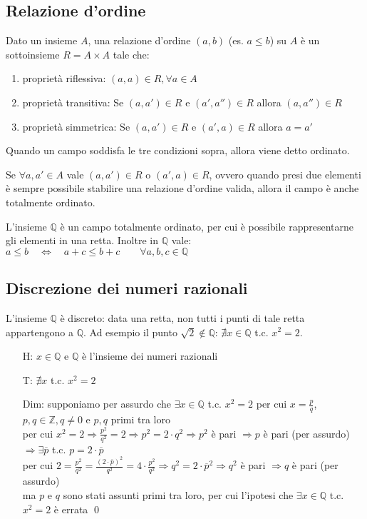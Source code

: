 \documentclass[a4paper]{article}
\begin{document}
\subsection{Relazione d'ordine}
Dato un insieme \(A\), una relazione d'ordine \((a, b)\) (es. \(a \leq b\)) su \(A\) è un sottoinsieme \(R = A \times A\) tale che:
\begin{enumerate}
	\item proprietà riflessiva: \((a, a) \in R, \forall a \in A\)
	\item proprietà transitiva: Se \((a, a') \in R\) e \((a', a'') \in R\) allora \((a, a'') \in R\)
	\item proprietà simmetrica: Se \((a, a') \in R\) e \((a', a) \in R\) allora \(a = a'\)
\end{enumerate}

Quando un campo soddisfa le tre condizioni sopra, allora viene detto ordinato.

Se \(\forall a,a' \in A\) vale \((a, a') \in R\) o \((a', a) \in R\), ovvero quando presi due elementi è sempre possibile
stabilire una relazione d'ordine valida, allora il campo è anche totalmente ordinato.

L'insieme \(\mathbb{Q}\) è un campo totalmente ordinato, per cui è possibile rappresentarne gli elementi in una retta.
Inoltre in \(\mathbb{Q}\) vale: \(a \leq b \quad \Leftrightarrow \quad a + c \leq b + c \qquad \forall a,b,c \in \mathbb{Q}\)


\subsection{Discrezione dei numeri razionali}
L'insieme \(\mathbb{Q}\) è discreto: data una retta, non tutti i punti di tale retta appartengono a \(\mathbb{Q}\).
Ad esempio il punto \(\sqrt{2} \notin \mathbb{Q}\): \(\nexists x \in \mathbb{Q}\) t.c. \(x^2 = 2\).
\begin{itemize}
	\item[H:] \(x \in \mathbb{Q}\) e \(\mathbb{Q}\) è l'insieme dei numeri razionali
	\item[T:] \(\nexists x\) t.c. \(x^2 = 2\)
	\item[Dim:] supponiamo per assurdo che \(\exists x \in \mathbb{Q}\) t.c. \(x^2 = 2\) per cui \(x = \displaystyle \frac{p}{q}\), \(p,q \in \mathbb{Z}, q \neq 0\) e \(p,q\) primi tra loro \\
	per cui \(x^2 = 2 \Rightarrow \displaystyle \frac{p^2}{q^2} = 2 \Rightarrow p^2 = 2 \cdot q^2 \Rightarrow p^2\) è pari \(\Rightarrow p\) è pari (per assurdo) \(\Rightarrow \exists \overline{p}\) t.c. \(p = 2 \cdot \overline{p}\) \\
	per cui \(2 = \displaystyle \frac{p^2}{q^2} = \frac{(2 \cdot \overline{p})^2}{q^2} = 4 \cdot \frac{p^2}{q^2} \Rightarrow q^2 = 2 \cdot \overline{p}^2 \Rightarrow q^2\) è pari \(\Rightarrow q\) è pari (per assurdo)\\
	ma \(p\) e \(q\) sono stati assunti primi tra loro, per cui l'ipotesi che \(\exists x \in \mathbb{Q}\) t.c. \(x^2 = 2\) è errata \qed
\end{itemize}
\end{document}
